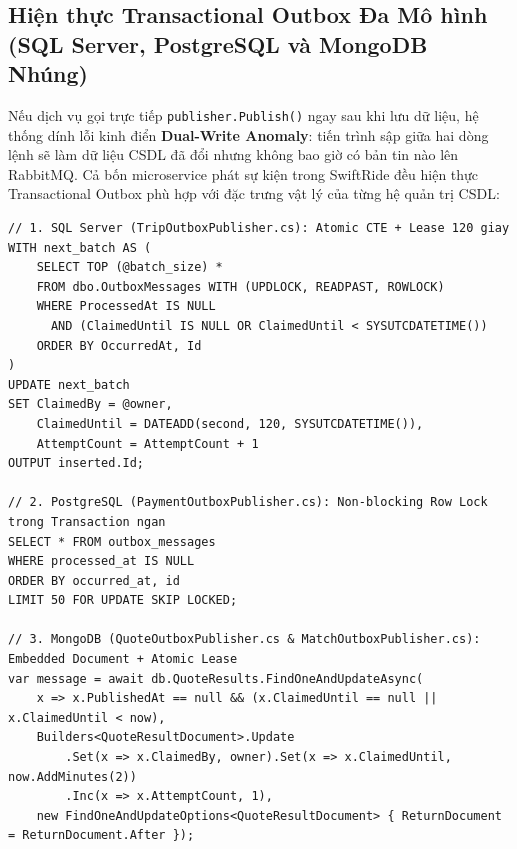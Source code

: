 \documentclass[12pt,a4paper]{article}
\begin{document}
\subsection{Hiện thực Transactional Outbox Đa Mô hình (SQL Server, PostgreSQL và MongoDB Nhúng)}
Nếu dịch vụ gọi trực tiếp \texttt{publisher.Publish()} ngay sau khi lưu dữ liệu, hệ thống dính lỗi kinh điển \textbf{Dual-Write Anomaly}: tiến trình sập giữa hai dòng lệnh sẽ làm dữ liệu CSDL đã đổi nhưng không bao giờ có bản tin nào lên RabbitMQ. Cả bốn microservice phát sự kiện trong SwiftRide đều hiện thực Transactional Outbox phù hợp với đặc trưng vật lý của từng hệ quản trị CSDL:

\begin{lstlisting}[caption={Ba co che phan chia lo Outbox nguyen tu tren SQL Server, PostgreSQL va MongoDB}]
// 1. SQL Server (TripOutboxPublisher.cs): Atomic CTE + Lease 120 giay
WITH next_batch AS (
    SELECT TOP (@batch_size) *
    FROM dbo.OutboxMessages WITH (UPDLOCK, READPAST, ROWLOCK)
    WHERE ProcessedAt IS NULL
      AND (ClaimedUntil IS NULL OR ClaimedUntil < SYSUTCDATETIME())
    ORDER BY OccurredAt, Id
)
UPDATE next_batch
SET ClaimedBy = @owner,
    ClaimedUntil = DATEADD(second, 120, SYSUTCDATETIME()),
    AttemptCount = AttemptCount + 1
OUTPUT inserted.Id;

// 2. PostgreSQL (PaymentOutboxPublisher.cs): Non-blocking Row Lock trong Transaction ngan
SELECT * FROM outbox_messages
WHERE processed_at IS NULL
ORDER BY occurred_at, id
LIMIT 50 FOR UPDATE SKIP LOCKED;

// 3. MongoDB (QuoteOutboxPublisher.cs & MatchOutboxPublisher.cs): Embedded Document + Atomic Lease
var message = await db.QuoteResults.FindOneAndUpdateAsync(
    x => x.PublishedAt == null && (x.ClaimedUntil == null || x.ClaimedUntil < now),
    Builders<QuoteResultDocument>.Update
        .Set(x => x.ClaimedBy, owner).Set(x => x.ClaimedUntil, now.AddMinutes(2))
        .Inc(x => x.AttemptCount, 1),
    new FindOneAndUpdateOptions<QuoteResultDocument> { ReturnDocument = ReturnDocument.After });
\end{lstlisting}
\end{document}
